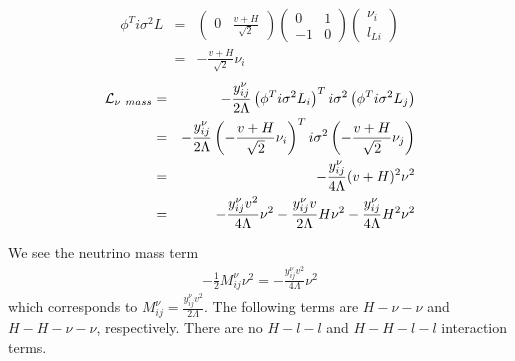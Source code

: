 \documentclass[11pt]{article}
\begin{document}
\section{ }
\begin{eqnarray}
    \phi^T i\sigma^2 L &=&
    \begin{pmatrix}
        0 & \frac{v+H}{\sqrt 2}
    \end{pmatrix} 
    \begin{pmatrix}
        0 & 1 \\
        -1 & 0
    \end{pmatrix} 
    \begin{pmatrix}
        \nu_i \\
        l_{Li}
    \end{pmatrix}\\
    &=& -\frac{v+H}{\sqrt{2}} \nu_i
\end{eqnarray}
\begin{eqnarray}
{\cal L}_{\nu~mass}
    &=& -\frac{y^\nu_{ij}}{2\Lambda} \left(\phi^T i\sigma^2 L_i\right)^T i\sigma^2 \left(\phi^T i\sigma^2 L_j\right)\\
    & =& -\frac{y^\nu_{ij}}{2\Lambda} \left(-\frac{v+H}{\sqrt{2}} \nu_i\right)^T i\sigma^2 \left(-\frac{v+H}{\sqrt{2}} \nu_j\right)\\
    & =& -\frac{y^\nu_{ij}}{4\Lambda} (v+H)^2 \nu^2\\
    & =& -\frac{y^\nu_{ij} v^2}{4\Lambda} \nu^2 - \frac{y^\nu_{ij}v}{2\Lambda} H\nu^2 - \frac{y^\nu_{ij}}{4\Lambda} H^2\nu^2
\end{eqnarray}

We see the neutrino mass term
\begin{eqnarray}
    -\frac{1}{2} M_{ij}^\nu \nu^2 = -\frac{y^\nu_{ij} v^2}{4\Lambda} \nu^2
\end{eqnarray}
which corresponds to $M_{ij}^\nu = \frac{y^\nu_{ij} v^2}{2\Lambda}$. The following terms are $H-\nu-\nu$ and $H-H-\nu-\nu$, respectively. There are no $H-l-l$ and $H-H-l-l$ interaction terms.
\end{document}
